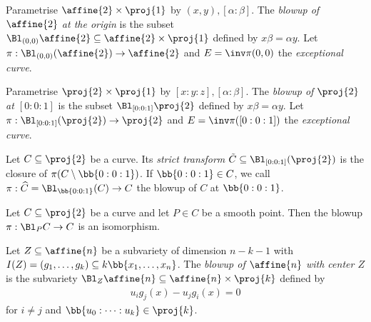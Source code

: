 \documentclass{article}
\begin{document}
\begin{definition}
  Parametrise $\affine{2}\times\proj{1}$ by $(x,y),[\alpha:\beta]$. The \emph{blowup
  of $\affine{2}$ at the origin} is the subset $\Bl_{(0,0)}\affine{2}\subseteq\affine{2}\times\proj{1}$
  defined by $x\beta = \alpha y$.
  Let $\pi:\Bl_{(0,0)}(\affine{2})\to\affine{2}$ and $E=\inv\pi(0,0)$ the \emph{exceptional curve}.
\end{definition}

\begin{definition}
  Parametrise $\proj{2}\times\proj{1}$ by $[x:y:z],[\alpha:\beta]$. The
  \emph{blowup of $\proj{2}$ at $[0:0:1]$} is the subset
  $\Bl_{[0:0:1]}\proj{2}$ defined by $x\beta = \alpha y$. Let
  $\pi:\Bl_{[0:0:1]}(\proj{2})\to\proj{2}$ and $E=\inv\pi([0:0:1])$ the \emph{exceptional
  curve}.
\end{definition}

\begin{definition}
  Let $C\subseteq\proj{2}$ be a curve. Its \emph{strict transform}
  $\tilde C\subseteq\Bl_{[0:0:1]}(\proj{2})$ is the closure of
  $\pi(C\setminus\bb{0:0:1})$. If $\bb{0:0:1}\in C$, we call
  $\pi:\widehat C=\Bl_{\bb{0:0:1}}(C)\to C$ the blowup of $C$ at
  $\bb{0:0:1}$.
\end{definition}

\begin{proposition}
  Let $C\subseteq\proj{2}$ be a curve and let $P\in C$ be a smooth point.
  Then the blowup $\pi:\Bl_P C\to C$ is an isomorphism.
\end{proposition}

\begin{definition}
  Let $Z\subseteq\affine{n}$ be a subvariety of dimension $n-k-1$ with
  $I(Z) = (g_1,\ldots,g_k)\subseteq k\bb{x_1,\ldots,x_n}$.
  The \emph{blowup of $\affine{n}$ with center $Z$} is the subvariety
  $\Bl_Z\affine{n}\subseteq\affine{n}\times\proj{k}$ defined by
  \begin{align*}
    u_i g_j(x) - u_j g_i(x) = 0
  \end{align*}
  for $i\neq j$ and $\bb{u_0:\cdots:u_k}\in\proj{k}$.
\end{definition}
\end{document}

